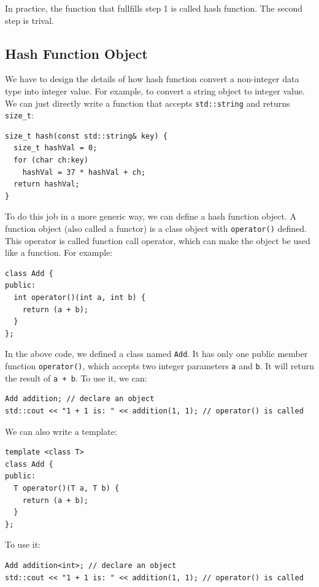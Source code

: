 \documentclass[12pt]{book}
\begin{document}
In practice, the function that fullfills step 1 is called hash function. The second step is trival.

\subsection{Hash Function Object}
\label{sec:orgf760231}
We have to design the details of how hash function convert a non-integer data type into integer value. For example, to convert a string object to integer value. We can just directly write a function that accepts \texttt{std::string} and returns \texttt{size\_t}:
\begin{verbatim}
size_t hash(const std::string& key) {
  size_t hashVal = 0;
  for (char ch:key)
    hashVal = 37 * hashVal + ch;
  return hashVal;
}
\end{verbatim}

To do this job in a more generic way, we can define a hash function object. A function object (also called a functor) is a class object with \texttt{operator()} defined. This operator is called function call operator, which can make the object be used like a function. For example:
\begin{verbatim}
class Add {
public:
  int operator()(int a, int b) {
    return (a + b);
  }
};
\end{verbatim}

In the above code, we defined a class named \texttt{Add}. It has only one public member function \texttt{operator()}, which accepts two integer parameters \texttt{a} and \texttt{b}. It will return the result of \texttt{a + b}. To use it, we can:
\begin{verbatim}
Add addition; // declare an object
std::cout << "1 + 1 is: " << addition(1, 1); // operator() is called
\end{verbatim}

We can also write a template:
\begin{verbatim}
template <class T>
class Add {
public:
  T operator()(T a, T b) {
    return (a + b);
  }
};
\end{verbatim}

To use it:
\begin{verbatim}
Add addition<int>; // declare an object
std::cout << "1 + 1 is: " << addition(1, 1); // operator() is called
\end{verbatim}
\end{document}

